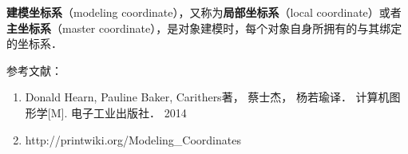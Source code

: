 
\textbf{建模坐标系}（modeling coordinate），又称为\textbf{局部坐标系}（local coordinate）或者\textbf{主坐标系}（master coordinate），是对象建模时，每个对象自身所拥有的与其绑定的坐标系．





参考文献：
\begin{enumerate}
\item Donald Hearn, Pauline Baker, Carithers著， 蔡士杰， 杨若瑜译． 计算机图形学[M]. 电子工业出版社． 2014
\item http://printwiki.org/Modeling\_Coordinates
\end{enumerate}